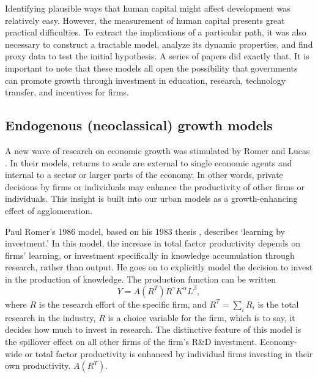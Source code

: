 
Identifying plausible ways that human capital might affect development was relatively easy. However, the measurement of human capital presents great practical difficulties. To extract the implications of a particular path, it was also necessary to construct a tractable model, analyze its dynamic properties, and find proxy data to test the initial hypothesis.   A series of papers did exactly that. It is important to note that these models all open the possibility that governments can promote growth through investment in education, research, technology transfer, and incentives for firms.




\subsection{Endogenous (neoclassical) growth models}
A new wave of research on economic growth was stimulated by Romer \cite{romerIncreasingReturnsLongRun1986} and Lucas \cite{lucasMechanicsEconomicDevelopment1988}. In their models, returns to scale are external to single economic agents and internal to a sector or larger parts of the economy. In other words, private decisions by firms or individuals may enhance the productivity of other firms or individuals. This insight is built into our urban models as a growth-enhancing effect of agglomeration. 


Paul Romer's 1986 model, based on his 1983 thesis \cite{romerIncreasingReturnsLongRun1986}, describes `learning by investment.' In this model, the increase in {total factor productivity} depends on firms' learning, or investment specifically in knowledge accumulation through research, rather than output. He goes on to explicitly model the decision to invest in the production of knowledge. The production function  can be written
\[Y = A(R^T)R^\gamma  K^\alpha L^\beta, \]
where $R$ is the research effort of the specific firm, and $R^T=\sum_iR_i$ is the total research in the industry,  $R$ is a choice variable for the firm, which is to say, it decides how much to invest in research. The distinctive feature of this model is the spillover effect on all other firms of the firm's R\&D investment. Economy-wide or  \gls{total factor productivity} is enhanced by individual firms investing in their own productivity. $A(R^T)$. %

